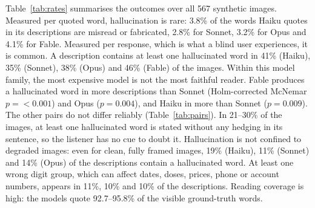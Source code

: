 \documentclass[pdflatex,sn-mathphys-num]{sn-jnl}%
\theoremstyle{thmstyleone}%
\theoremstyle{thmstyletwo}%
\theoremstyle{thmstylethree}%
\newcommand{\HallPFableDesc}{4.1}
\newcommand{\HallPHaikuDesc}{3.8}
\newcommand{\HallPOpusDesc}{3.2}
\newcommand{\HallPSonnetDesc}{2.8}
\newcommand{\ImgCleanFullHaiku}{19}
\newcommand{\ImgCleanFullOpus}{14}
\newcommand{\ImgCleanFullSonnet}{11}
\newcommand{\ImgDigitHaiku}{11}
\newcommand{\ImgDigitOpus}{10}
\newcommand{\ImgDigitSonnet}{10}
\newcommand{\ImgPFableDesc}{46}
\newcommand{\ImgPHaikuDesc}{41}
\newcommand{\ImgPOpusDesc}{38}
\newcommand{\ImgPSonnetDesc}{35}
\newcommand{\NImages}{567}
\newcommand{\RangeCov}{92.7--95.8}
\newcommand{\RangeImgUnh}{21--30}
\newcommand{\SynPairHaikuSonnetP}{0.009}
\newcommand{\SynPairOpusFableP}{0.004}
\newcommand{\SynPairSonnetFableP}{<0.001}
\begin{document}
Table~\ref{tab:rates} summarises the outcomes over all \NImages{} synthetic images. Measured per quoted word, hallucination is rare: \HallPHaikuDesc\% of the words Haiku quotes in its descriptions are misread or fabricated, \HallPSonnetDesc\% for Sonnet, \HallPOpusDesc\% for Opus and \HallPFableDesc\% for Fable. Measured per response, which is what a blind user experiences, it is common. A description contains at least one hallucinated word in \ImgPHaikuDesc\% (Haiku), \ImgPSonnetDesc\% (Sonnet), \ImgPOpusDesc\% (Opus) and \ImgPFableDesc\% (Fable) of the images. Within this model family, the most expensive model is not the most faithful reader. Fable produces a hallucinated word in more descriptions than Sonnet (Holm-corrected McNemar $p=\SynPairSonnetFableP$) and Opus ($p=\SynPairOpusFableP$), and Haiku in more than Sonnet ($p=\SynPairHaikuSonnetP$). The other pairs do not differ reliably (Table~\ref{tab:pairs}). In \RangeImgUnh\% of the images, at least one hallucinated word is stated without any hedging in its sentence, so the listener has no cue to doubt it. Hallucination is not confined to degraded images: even for clean, fully framed images, \ImgCleanFullHaiku\% (Haiku), \ImgCleanFullSonnet\% (Sonnet) and \ImgCleanFullOpus\% (Opus) of the descriptions contain a hallucinated word. At least one wrong digit group, which can affect dates, doses, prices, phone or account numbers, appears in \ImgDigitHaiku\%, \ImgDigitSonnet\% and \ImgDigitOpus\% of the descriptions. Reading coverage is high: the models quote \RangeCov\% of the visible ground-truth words.
\end{document}
